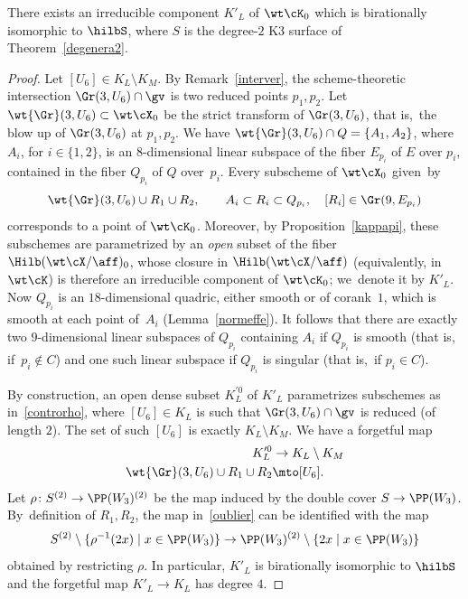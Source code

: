 \begin{prop}\label{elletilde}
There exists an irreducible component $K'_L$ of $\wt\cK_0$ which is birationally isomorphic to $\hilbS$, where $S$ is the degree-$2$ K3 surface of Theorem~\ref{degenera2}.
\end{prop}

\begin{proof}
Let $[U_6]\in K_L \setminus K_M $. By Remark~\ref{interver}, the scheme-theoretic intersection $\Gr(3,U_6)\cap\gv$ is two reduced points
$p_1,p_2$. Let $\wt{\Gr}(3,U_6)\subset \wt\cX_0$ be the strict transform of $\Gr(3,U_6)$, that is,~the blow up of $\Gr(3,U_6)$ at $p_1,p_2$. We have $\wt{\Gr}(3,U_6)\cap Q=\{A_1,A_2\}$, where $A_i$, for $i\in\{1,2\}$, is an $8$-dimensional linear subspace of the fiber $E_{p_i}$ of $E$ over $p_i$, contained in the fiber $Q_{p_i}$ of $Q$ over~$p_i$.
Every subscheme of $\wt\cX_0$ given~by%
\begin{equation}\label{controrho}
\wt{\Gr}(3,U_6)\cup R_1\cup R_2, \qquad A_i\subset R_i\subset Q_{p_i},\quad [R_i]\in\Gr(9,E_{p_i})
\end{equation}
corresponds to a point of $\wt\cK_0$. Moreover, by Proposition~\ref{kappapi}, these subschemes are parametrized by an \emph{open} subset of the fiber $\Hilb(\wt\cX/\aff)_0$, whose closure in $\Hilb(\wt\cX/\aff)$ (equivalently, in $\wt\cK$) is therefore an irreducible component of $\wt\cK_0$; we~denote it by $K'_L$. Now
$Q_{p_i}$ is an $18$-dimensional quadric, either smooth or of corank~$1$, which is smooth at each point of~$A_i$ (Lemma~\ref{normeffe}). It follows that there are exactly two $9$-dimensional linear subspaces of $Q_{p_i}$ containing $A_i$ if $Q_{p_i}$ is smooth (that is, if~$p_i\notin C$) and one such linear subspace if $Q_{p_i}$ is singular (that is,~if $p_i\in C$).

{By construction, an open dense subset $K_L^{\prime0}$ of $K'_L$ parametrizes subschemes as in~\eqref{controrho}, where $[U_6]\in K_L$ is such that
$\Gr(3,U_6)\cap\gv$ is reduced (of length $2$). The set of such $[U_6]$ is exactly $K_L\setminus K_M$. We have a forgetful map
\begin{equation}
\begin{aligned} \label{oublier}
K_L^{\prime0}& \to K_L\setminus K_M \\
\wt{\Gr}(3,U_6)\cup R_1\cup R_2 & \mto [U_6].
\end{aligned}
\end{equation}
Let $\rho\colon S^{(2)}\to\PP(W_3)^{(2)}$ be the map induced by the double cover $S\to\PP(W_3)$. By~definition of $R_1,R_2$, the map in~\eqref{oublier} can be identified with the map
\[
S^{(2)}\setminus\{\rho^{-1}(2x) \mid x\in \PP(W_3)\} \to \PP(W_3)^{(2)}\setminus\{2x \mid x\in\PP(W_3)\}
\]
obtained by restricting $\rho$. In particular,
$K'_L$ is birationally isomorphic to $\hilbS$ and the forgetful map $K'_L\to K_L$ has degree $4$.}
\end{proof}


